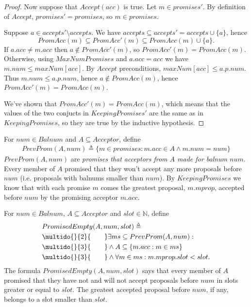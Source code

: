 \documentclass[12pt,a4paper,en]{pracamgr}
\newcommand{\ti}[1]{\textit{#1}}
\newcommand{\mbb}[1]{\mathbb{#1}}
\newcommand{\ind}[1]{\multido{}{#1}{\qquad}}
\begin{document}
\begin{proof}
    Now suppose that $Accept(acc)$ is true. Let $m \in promises'$. By definition of $Accept$, $promises' = promises$, so $m \in promises$.

    Suppose $a \in accepts' \setminus accepts$. We have $accepts \subseteq accepts' = accepts \cup \{a\}$, hence
    $$ PromAcc(m) \subseteq PromAcc'(m) \subseteq PromAcc(m) \cup \{a\}. $$
    If $a.acc \neq m.acc$ then $a \notin PromAcc'(m)$, so $PromAcc'(m) = PromAcc(m)$. Otherwise, using $MaxNumPromises$ and $a.acc = acc$ we have $m.num \le maxNum[acc]$. By $Accept$ preconditions, $maxNum[acc] \le a.p.num$. Thus $m.num \le a.p.num$, hence $a \notin PromAcc(m)$, hence $PromAcc'(m) = PromAcc(m)$.

    We've shown that $PromAcc'(m) = PromAcc(m)$, which means that the values of the two conjucts in $KeepingPromises'$ are the same as in $KeepingPromises$, so they are true by the inductive hypothesis.

\end{proof}

For $num \in Balnum$ and $A \subseteq Acceptor$, define
\begin{align*}
    PrevProm(A, num) \triangleq \{m \in promises: m.acc \in A \land m.num = num\}
\end{align*}
$PrevProm(A, num)$ are \ti{promises that acceptors from $A$ made for balnum $num$}. Every member of $A$ promised that they won't accept any more proposals before $num$ (i.e. proposals with balnums smaller than $num$). By $KeepingPromises$ we know that with each promise $m$ comes the greatest proposal, $m.mprop$, accepted before $num$ by the promising acceptor $m.acc$.

For $num \in Balnum$, $A \subseteq Acceptor$ and $slot \in \mbb N$, define
\begin{align*}
    & PromisedEmpty(A, num, slot) \triangleq\\
    & \ind{2} \exists ms \subseteq PrevProm(A, num):\\
    & \ind{3} \land A \subseteq \{m.acc: m \in ms\}\\
    & \ind{3} \land \forall m \in ms: m.mprop.slot < slot.
\end{align*}
The formula $PromisedEmpty(A, num, slot)$ says that every member of $A$ promised that they have not and will not accept proposals before $num$ in slots greater or equal to $slot$. The greatest accepted proposal before $num$, if any, belongs to a slot smaller than $slot$.
\end{document}
